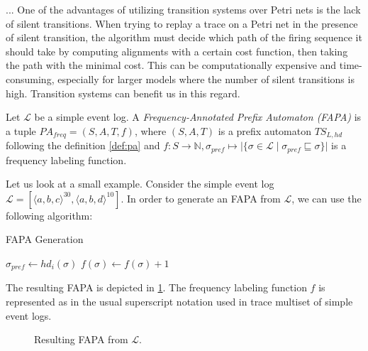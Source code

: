 ... One of the advantages of utilizing transition systems over Petri nets is the lack of silent transitions. When trying to replay a trace on a Petri net in the presence of silent transition, the algorithm must decide which path of the firing sequence it should take by computing alignments with a certain cost function, then taking the path with the minimal cost. This can be computationally expensive and time-consuming, especially for larger models where the number of silent transitions is high. Transition systems can benefit us in this regard.

\begin{definition}
    Let $\mathcal{L}$ be a simple event log. A \emph{Frequency-Annotated Prefix Automaton (FAPA)} is a tuple $PA_{freq} = (S, A, T, f)$, where $(S, A, T)$ is a prefix automaton $TS_{L, hd}$ following the definition \ref{def:pa} and  $f: S \to \mathbb{N}, \sigma_{pref} \mapsto \lvert \{ \sigma \in \mathcal{L} \mid \sigma_{pref} \sqsubseteq \sigma \}\rvert$ is a frequency labeling function.
\end{definition}

Let us look at a small example. Consider the simple event log $\mathcal{L} = [\langle a, b, c \rangle^{30}, \langle a, b, d \rangle^{10}]$. In order to generate an FAPA from $\mathcal{L}$, we can use the following algorithm:

\begin{algorithm}
\caption[short]{FAPA Generation}
    {
        {
            $\sigma_{pref} \gets hd_i(\sigma)$\;
            $f(\sigma) \gets f(\sigma) + 1$\;
        }
    }
\end{algorithm}

The resulting FAPA is depicted in \ref{fig:fapa}. The frequency labeling function $f$ is represented as in the usual superscript notation used in trace multiset of simple event logs.

\begin{figure}
    \centering
    \caption{Resulting FAPA from $\mathcal{L}$.}
    \label{fig:fapa}
\end{figure}

